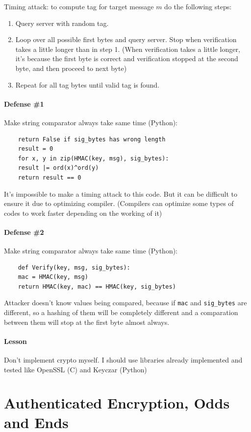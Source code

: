 \documentclass[12pt]{book}
\begin{document}
Timing attack: to compute tag for target message $m$ do the following steps:
\begin{enumerate}
	\item Query server with random tag.
	\item Loop over all possible first bytes and query server. Stop when verification takes a little longer than in step 1. (When verification takes a little longer, it's because the first byte is correct and verification stopped at the second byte, and then proceed to next byte)
	\item Repeat for all tag bytes until valid tag is found.
\end{enumerate}

\subsubsection{Defense \#1}
Make string comparator always take same time (Python):
\begin{verbatim}
	return False if sig_bytes has wrong length
	result = 0
	for x, y in zip(HMAC(key, msg), sig_bytes):
	result |= ord(x)^ord(y)
	return result == 0
\end{verbatim}It's impossible to make a timing attack to this code. But it can be difficult to ensure it due to optimizing compiler. (Compilers can optimize some types of codes to work faster depending on the working of it)

\subsubsection{Defense \#2}
Make string comparator always take same time (Python):
\begin{verbatim}
	def Verify(key, msg, sig_bytes):
	mac = HMAC(key, msg)
	return HMAC(key, mac) == HMAC(key, sig_bytes)
\end{verbatim}Attacker doesn't know values being compared, because if \verb|mac| and \verb|sig_bytes| are different, so a hashing of them will be completely different and a comparation between them will stop at the first byte almost always.

\subsubsection{Lesson}
Don't implement crypto myself. I should use libraries already implemented and tested like OpenSSL (C) and Keyczar (Python)

\chapter{Authenticated Encryption, Odds and Ends}
\end{document}
